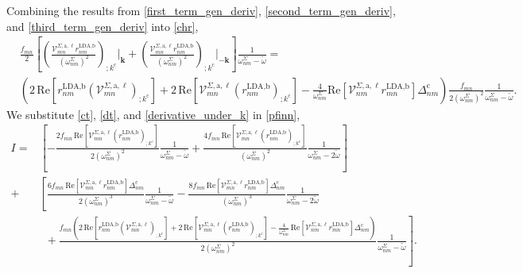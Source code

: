 Combining the results from \eqref{first_term_gen_deriv},
\eqref{second_term_gen_deriv}, and \eqref{third_term_gen_deriv}
into \eqref{chr},
\begin{align}\label{derivative_under_k}
&\frac{f_{mn}}{2}
\left[
\left(
\frac{\mathcal{V}^{\Sigma,\text{a},\ell}_{mn}
r^{\text{LDA,b}}_{nm}}{(\omega^\Sigma_{nm})^2}
\right)_{;k^{\text{c}}}\vert_{\mathbf{k}} 
+ \left(
  \frac{\mathcal{V}^{\Sigma,\text{a},\ell}_{mn}
  r^{\text{LDA,b}}_{nm}}{(\omega^\Sigma_{nm})^2}
  \right)_{;k^{\text{c}}}\vert_{-\mathbf{k}}
  \right]
  \frac{1}{\omega^\Sigma_{nm}-\tilde\omega}
= \nonumber\\
& \left(
  2\,\mathrm{Re}\left[r^{\text{LDA,b}}_{nm}
  \left(
  \mathcal{V}^{\Sigma,\text{a},\ell}_{mn}
  \right)_{;k^{\text{c}}}
  \right]
+ 2\,\mathrm{Re}\left[\mathcal{V}^{\Sigma,\text{a},\ell}_{mn}
  \left(
  r^{\text{LDA,b}}_{nm}
  \right)_{;k^{\text{c}}}
  \right] 
- \frac{4}{\omega^{\Sigma}_{nm}}\mathrm{Re}
  \left[
  \mathcal{V}^{\Sigma,\text{a},\ell}_{nm}r^{\text{LDA,b}}_{mn}
  \right]
  \Delta_{nm}^{\text{c}}
  \right)
  \frac{f_{mn}}{2(\omega^{\Sigma}_{nm})^{2}}
  \frac{1}{\omega^\Sigma_{nm}-\tilde\omega}.
\end{align}
We substitute \eqref{ct}, \eqref{dt}, and \eqref{derivative_under_k} in 
\eqref{pfinn},
\begin{align*}
I
=   &\left[
    -\frac{2f_{mn}\,\mathrm{Re}
    \left[\mathcal{V}^{\Sigma,\text{a},\ell}_{mn}
    \left(r^{\text{LDA,b}}_{nm}\right)_{;k^{\text{c}}}\right]}
    {2(\omega^{\Sigma}_{nm})^{2}}\frac{1}{\omega^{\Sigma}_{nm}-\tilde\omega} 
+   \frac{4f_{mn}\,\mathrm{Re}\left[\mathcal{V}^{\Sigma,\text{a},\ell}_{mn}
    \left(r^{\text{LDA,b}}_{nm}\right)_{;k^{\text{c}}}\right]}
    {(\omega^{\Sigma}_{nm})^{2}}\frac{1}{\omega^{\Sigma}_{nm}-2\tilde\omega}
    \right]\nonumber\\
+   &\left[\frac{6f_{mn}\,\mathrm{Re}
    \left[\mathcal{V}^{\Sigma,\text{a},\ell}_{mn}r^{\text{LDA,b}}_{nm}\right]
    \Delta^{\text{c}}_{nm}}{2(\omega^{\Sigma}_{nm})^{3}}
    \frac{1}{\omega^{\Sigma}_{nm}-\tilde\omega} 
-   \frac{8f_{mn}\,\mathrm{Re}
    \left[\mathcal{V}^{\Sigma,\text{a},\ell}_{mn}r^{\text{LDA,b}}_{nm}\right]
    \Delta^{\text{c}}_{nm}}{(\omega^{\Sigma}_{nm})^{3}}
    \frac{1}{\omega^{\Sigma}_{nm}-2\tilde\omega}\right.\nonumber\\
&\,\,\,+ 
    \left.\frac{f_{mn}\left(2\,\mathrm{Re}\left[r^{\text{LDA,b}}_{nm}
    \left(\mathcal{V}^{\Sigma,\text{a},\ell}_{mn}\right)_{;k^{\text{c}}}\right]
+   2\,\mathrm{Re}\left[\mathcal{V}^{\Sigma,\text{a},\ell}_{mn}
    \left(r^{\text{LDA,b}}_{nm}\right)_{;k^{\text{c}}}\right] 
-   \frac{4}{\omega^{\Sigma}_{nm}}\,\mathrm{Re}
    \left[\mathcal{V}^{\Sigma,\text{a},\ell}_{nm}r^{\text{LDA,b}}_{mn}\right]
    \Delta_{nm}^{\text{c}}\right)}{2(\omega^{\Sigma}_{nm})^{2}}
    \frac{1}{\omega^\Sigma_{nm}-\tilde\omega}\right]
.
\end{align*}
